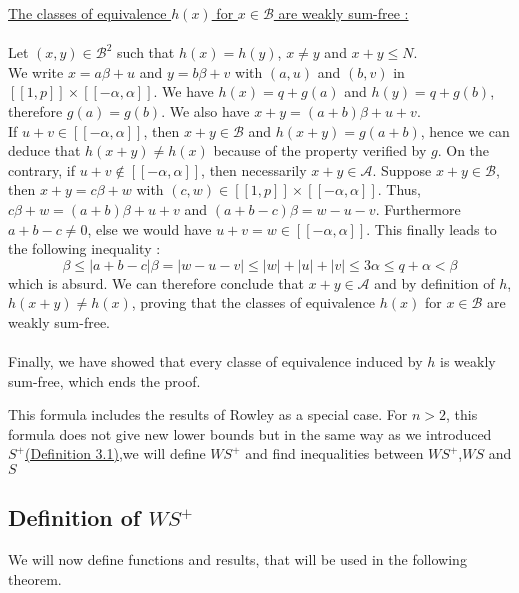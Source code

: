 \underline{The classes of equivalence \(h(x)\) for \(x \in \mathcal{B}\) are weakly sum-free :}
\\
\\
Let \((x,y) \in \mathcal{B}^2\) such that \(h(x) = h(y)\), \(x \neq y\) and \(x + y \leqslant N\).\\
We write \(x = a\beta + u\) and \(y = b\beta + v\) with \((a,u)\) and \((b,v)\) in \([\![1,p]\!] \times
[\![-\alpha,\alpha]\!]\).
We have \(h(x) = q + g(a)\) and \(h(y) = q + g(b)\), therefore \(g(a) = g(b)\). We also have \(x+y = (a+b)\beta + u
+v\).\\
If \(u + v \in [\![-\alpha,\alpha]\!]\), then \(x+y \in \mathcal{B}\) and \(h(x+y) = g(a+b)\), hence we can deduce that
\(h(x+y) \neq h(x)\) because of the property verified by \(g\). On the contrary, if \(u+v \notin
[\![-\alpha,\alpha]\!]\), then necessarily \(x+y \in \mathcal{A}\). Suppose \(x+y \in \mathcal{B}\), then \(x+y =
c\beta+ w\) with \((c,w) \in [\![1,p]\!] \times [\![-\alpha,\alpha]\!]\). Thus, \(c\beta + w = (a+b)\beta + u + v\) and
\((a+b-c)\beta = w-u-v\). Furthermore \(a+b-c \neq 0\), else we would have \(u+v = w \in [\![-\alpha,\alpha]\!]\). This
finally leads to the following inequality :
\[\beta \leqslant |a+b-c|\beta = |w-u-v| \leqslant |w| + |u| + |v| \leqslant 3\alpha \leqslant q + \alpha < \beta
\]
which is absurd. We can therefore conclude that \(x+y \in \mathcal{A}\) and by definition of \(h\), \(h(x+y) \neq
h(x)\), proving that the classes of equivalence \(h(x)\) for \(x \in \mathcal{B}\) are weakly sum-free.\\
\\
Finally, we have showed that every classe of equivalence induced by \(h\) is weakly sum-free, which ends the proof.

\begin{remark}
This formula includes the results of Rowley \cite{RowleyWS} as a special case. For \(n>2\),
this formula does not give new lower bounds but in the same way as we introduced \(S^+\)\hyperref[SE]{(Definition
3.1)},we will define \(WS^+\) and find inequalities between \(WS^+\),\(WS\) and \(S\)
\end{remark}

\subsection{Definition of \(WS^+\)}

We will now define functions and results, that will be used in the following theorem.

